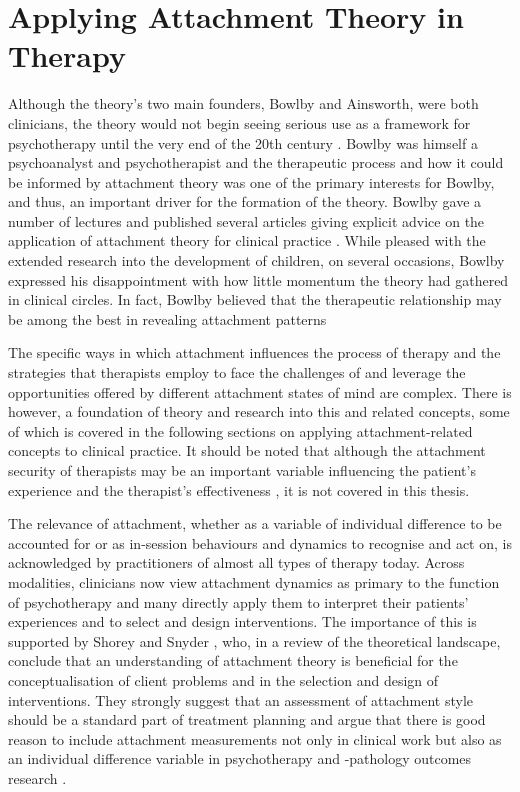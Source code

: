 \documentclass[12pt]{report}
\begin{document}
\section{Applying Attachment Theory in Therapy}
\label{sec:Applying attachment in therapy}
Although the theory's two main founders, Bowlby and Ainsworth, were both clinicians, the theory would not begin seeing serious use as a framework for psychotherapy until the very end of the 20th century \cite{Slade2019}.
Bowlby was himself a psychoanalyst and psychotherapist and the therapeutic process and how it could be informed by attachment theory was one of the primary interests for Bowlby, and thus, an important driver for the formation of the theory.
Bowlby gave a number of lectures and published several articles giving explicit advice on the application of attachment theory for clinical practice \cite{Bowlby2005b}.
While pleased with the extended research into the development of children, on several occasions, Bowlby expressed his disappointment with how little momentum the theory had gathered in clinical circles.
In fact, Bowlby believed that the therapeutic relationship may be among the best in revealing attachment patterns \cite{Bowlby1988}

The specific ways in which attachment influences the process of therapy and the strategies that therapists employ to face the challenges of and leverage the opportunities offered by different attachment states of mind are complex.
There is however, a foundation of theory and research into this and related concepts, some of which is covered in the following sections on applying attachment-related concepts to clinical practice.
It should be noted that although the attachment security of therapists may be an important variable influencing the patient's experience and the therapist's effectiveness \cite{Mikulincer2013, Daniel2006, Dozier1994, Cologon2017, Talia2020}, it is not covered in this thesis.

The relevance of attachment, whether as a variable of individual difference to be accounted for or as in-session behaviours and dynamics to recognise and act on, is acknowledged by practitioners of almost all types of therapy today.
Across modalities, clinicians now view attachment dynamics as primary to the function of psychotherapy and many directly apply them to interpret their patients' experiences and to select and design interventions.
The importance of this is supported by Shorey and Snyder \citeyear{Shorey2006}, who, in a review of the theoretical landscape, conclude that an understanding of attachment theory is beneficial for the conceptualisation of client problems and in the selection and design of interventions.
They strongly suggest that an assessment of attachment style should be a standard part of treatment planning and argue that there is good reason to include attachment measurements not only in clinical work but also as an individual difference variable in psychotherapy and -pathology outcomes research \cite{Shorey2006}.
\end{document}
